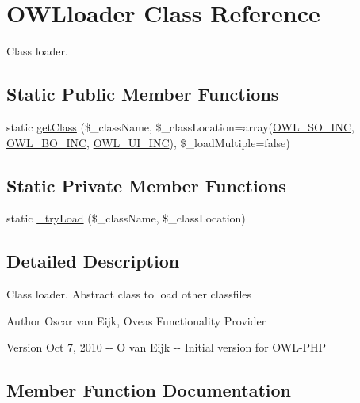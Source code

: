 \section{OWLloader Class Reference}
\label{classOWLloader}


Class loader.  


\subsection*{Static Public Member Functions}
\begin{DoxyCompactItemize}
\item 
static \hyperlink{classOWLloader_a271d6508b029b3989db57f4d9b9b7677}{getClass} (\$\_\-className, \$\_\-classLocation=array(\hyperlink{OWLloader_8php_a75dffdef5ba58a0ba5f21ed40627897f}{OWL\_\-SO\_\-INC}, \hyperlink{OWLloader_8php_aca50646bc73c3addf0e0f25081eae0ae}{OWL\_\-BO\_\-INC}, \hyperlink{OWLloader_8php_a2e11101c70f011a91d0d9c7f8e217738}{OWL\_\-UI\_\-INC}), \$\_\-loadMultiple=false)
\end{DoxyCompactItemize}
\subsection*{Static Private Member Functions}
\begin{DoxyCompactItemize}
\item 
static \hyperlink{classOWLloader_a763911b4bc08982e24f1f897362f8c90}{\_\-tryLoad} (\$\_\-className, \$\_\-classLocation)
\end{DoxyCompactItemize}


\subsection{Detailed Description}
Class loader. Abstract class to load other classfiles \begin{DoxyAuthor}{Author}
Oscar van Eijk, Oveas Functionality Provider 
\end{DoxyAuthor}
\begin{DoxyVersion}{Version}
Oct 7, 2010 -\/-\/ O van Eijk -\/-\/ Initial version for OWL-\/PHP 
\end{DoxyVersion}


\subsection{Member Function Documentation}
